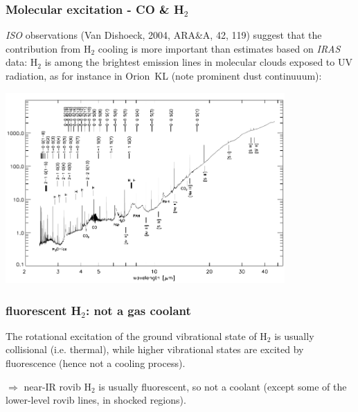 \begin{frame}\frametitle{Molecular excitation - CO \& H$_2$}




{\em ISO} observations (Van Dishoeck, 2004, ARA\&A, 42, 119)
suggest that the contribution from H$_2$ cooling is more important
than estimates based on {\em IRAS} data: H$_2$ is among the brightest
emission lines in molecular clouds exposed to UV radiation, as for
instance in Orion~KL (note prominent dust continuuum):


\includegraphics[width=0.8\textwidth,height=!]{./B/dishoeck_fig3.pdf}

\end{frame} \begin{frame}\frametitle{fluorescent H$_2$: not a gas coolant}

The rotational excitation of the ground vibrational state of H$_2$ is
usually collisional (i.e. thermal), while higher vibrational states are excited by fluorescence (hence not a cooling process). 

\medskip

$\Rightarrow$ near-IR rovib H$_2$ is usually fluorescent, so not a
coolant (except some of the lower-level rovib lines, in shocked regions). 


\end{frame}
